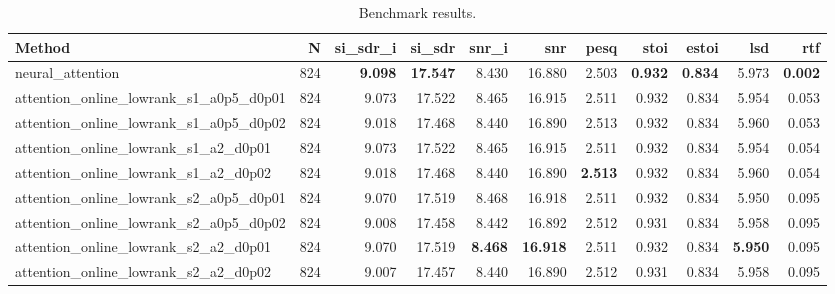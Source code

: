 \begin{table}[t]
\centering
\caption{Benchmark results.}
\label{tab:bench}
\begin{tabular}{lrrrrrrrrrr}
\toprule
Method & N & si\_sdr\_i & si\_sdr & snr\_i & snr & pesq & stoi & estoi & lsd & rtf \\
\midrule
neural_attention & 824 & \textbf{9.098} & \textbf{17.547} & 8.430 & 16.880 & 2.503 & \textbf{0.932} & \textbf{0.834} & 5.973 & \textbf{0.002} \\
attention_online_lowrank_s1_a0p5_d0p01 & 824 & 9.073 & 17.522 & 8.465 & 16.915 & 2.511 & 0.932 & 0.834 & 5.954 & 0.053 \\
attention_online_lowrank_s1_a0p5_d0p02 & 824 & 9.018 & 17.468 & 8.440 & 16.890 & 2.513 & 0.932 & 0.834 & 5.960 & 0.053 \\
attention_online_lowrank_s1_a2_d0p01 & 824 & 9.073 & 17.522 & 8.465 & 16.915 & 2.511 & 0.932 & 0.834 & 5.954 & 0.054 \\
attention_online_lowrank_s1_a2_d0p02 & 824 & 9.018 & 17.468 & 8.440 & 16.890 & \textbf{2.513} & 0.932 & 0.834 & 5.960 & 0.054 \\
attention_online_lowrank_s2_a0p5_d0p01 & 824 & 9.070 & 17.519 & 8.468 & 16.918 & 2.511 & 0.932 & 0.834 & 5.950 & 0.095 \\
attention_online_lowrank_s2_a0p5_d0p02 & 824 & 9.008 & 17.458 & 8.442 & 16.892 & 2.512 & 0.931 & 0.834 & 5.958 & 0.095 \\
attention_online_lowrank_s2_a2_d0p01 & 824 & 9.070 & 17.519 & \textbf{8.468} & \textbf{16.918} & 2.511 & 0.932 & 0.834 & \textbf{5.950} & 0.095 \\
attention_online_lowrank_s2_a2_d0p02 & 824 & 9.007 & 17.457 & 8.440 & 16.890 & 2.512 & 0.931 & 0.834 & 5.958 & 0.095 \\
\bottomrule
\end{tabular}
\end{table}